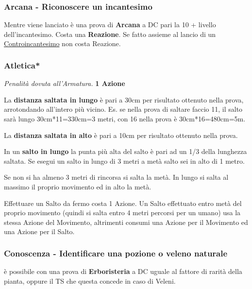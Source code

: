 \begin{multicols}{2}
\titlespacing*{\subsubsection}{0pt}{0.5em}{0.5em}\subsubsection*{Arcana - Riconoscere un incantesimo}  \label{riconoscereincantesimo}\hypertarget{riconoscereincantesimo}{}
Mentre viene lanciato è una prova di \textbf{Arcana} a DC pari la 10 + livello dell'incantesimo. Costa una \textbf{Reazione}. Se fatto assieme al lancio di un \hyperlink{Controincantesimo}{Controincantesimo} non costa Reazione.

\titlespacing*{\subsubsection}{0pt}{0.5em}{0.5em}\subsubsection*{Atletica*} \emph{Penalità dovuta all'Armatura.} \textbf{1 Azione}\label{atletica}\label{saltare}

La \textbf{distanza saltata in lungo} è pari a 30cm per risultato ottenuto nella prova, arrotondando all'intero più vicino. Es. se nella prova di saltare faccio 11, il salto sarà lungo 30cm*11=330cm=3 metri, con 16 nella prova è 30cm*16=480cm=5m.

La \textbf{distanza saltata in alto} è pari a 10cm per risultato ottenuto nella prova.

In un \textbf{salto in lungo} la punta più alta del salto è pari ad un 1/3 della lunghezza saltata. Se esegui un salto in lungo di 3 metri a metà salto sei in alto di 1 metro.

Se non si ha almeno 3 metri di rincorsa si salta la metà. In lungo si salta al massimo il proprio movimento ed in alto la metà.

Effettuare un Salto da fermo costa 1 Azione. Un Salto effettuato entro metà del proprio movimento (quindi si salta entro 4 metri percorsi per un umano) usa la stessa Azione del Movimento, altrimenti consumi una Azione per il Movimento ed una Azione per il Salto.

\titlespacing*{\subsubsection}{0pt}{0.5em}{0.5em}\subsubsection*{Conoscenza - Identificare una pozione o veleno naturale} \label{identificarepozioni}
è possibile con una prova di \textbf{Erboristeria} a DC uguale al fattore di rarità della pianta, oppure il TS che questa concede in caso di Veleni.


\end{multicols}
